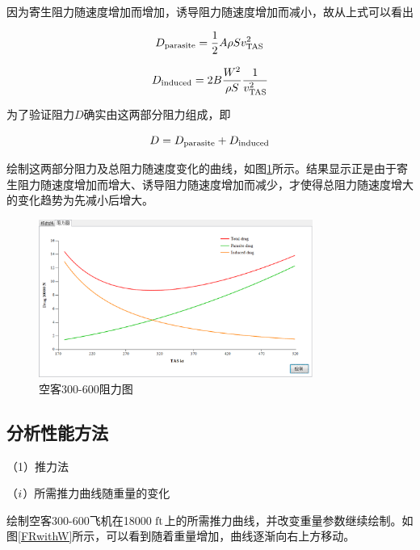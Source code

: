 \documentclass[a4paper,punct,space,heading=true,AutoFakeBold]{ctexrep}
\begin{document}
因为寄生阻力随速度增加而增加，诱导阻力随速度增加而减小，故从上式可以看出

\begin{equation}
D_{\rm parasite}=\frac{1}{2}A\rho S v_{\rm TAS}^2
\end{equation}

\begin{equation}
D_{\rm induced}=2B\frac{W^2}{\rho S}\frac{1}{v_{\rm TAS}^2}
\end{equation}

为了验证阻力$D$确实由这两部分阻力组成，即

\begin{equation}
D=D_{\rm parasite}+D_{\rm induced}
\end{equation}

绘制这两部分阻力及总阻力随速度变化的曲线，如图\ref{dragcurve}所示。结果显示正是由于寄生阻力随速度增加而增大、诱导阻力随速度增加而减少，才使得总阻力随速度增大的变化趋势为先减小后增大。

\begin{figure}[h]
	\centering
	\includegraphics[width=0.8\textwidth]{pic/drag.eps}\hspace{30pt}
	\caption{空客300-600阻力图}\label{dragcurve}
\end{figure}

\subsection{分析性能方法}

（1）推力法

（$\romannumeral1$）所需推力曲线随重量的变化

绘制空客300-600飞机在18000 $\rm ft$上的所需推力曲线，并改变重量参数继续绘制。如图\ref{FRwithW}所示，可以看到随着重量增加，曲线逐渐向右上方移动。
\end{document}
